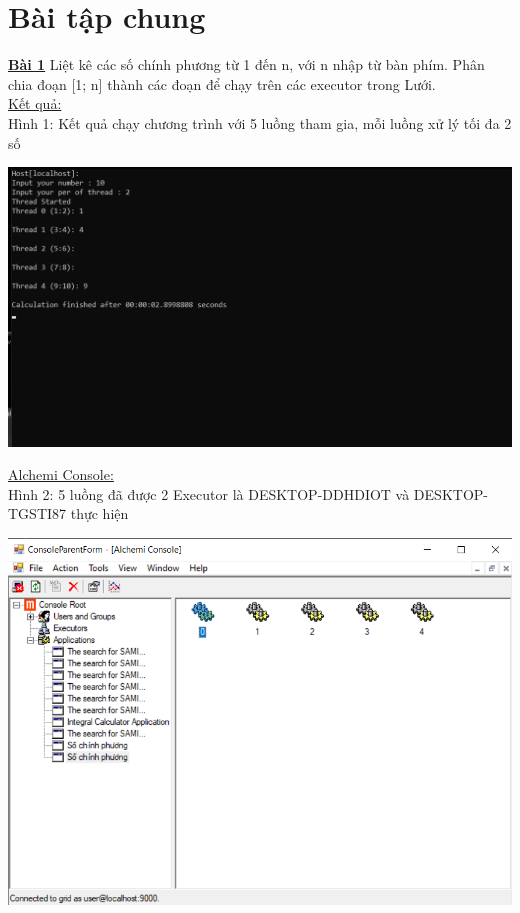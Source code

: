 \documentclass[12pt,a4paper]{article}
\begin{document}
\newpage
\tableofcontents
\newpage
\section{Bài tập chung}
\underline{\textbf{Bài 1}} Liệt kê các số chính phương từ 1 đến n, với n nhập từ bàn phím. Phân chia đoạn [1; n] thành các đoạn để chạy trên các executor trong Lưới. \\[1cm]

\underline{Kết quả:}\\[0.3cm]
Hình 1: Kết quả chạy chương trình với 5 luồng tham gia, mỗi luồng xử lý tối đa 2 số
\begin{center}
\includegraphics[scale=0.7]{2.png}\\[8cm]
\end{center} 



\underline{Alchemi Console:} \\[0.5cm]

Hình 2: 5 luồng đã được 2 Executor là DESKTOP-DDHDIOT và DESKTOP-TGSTI87 thực hiện
\begin{center}
\includegraphics[scale=0.86]{2.0.png}
\end{center}
\end{document}

